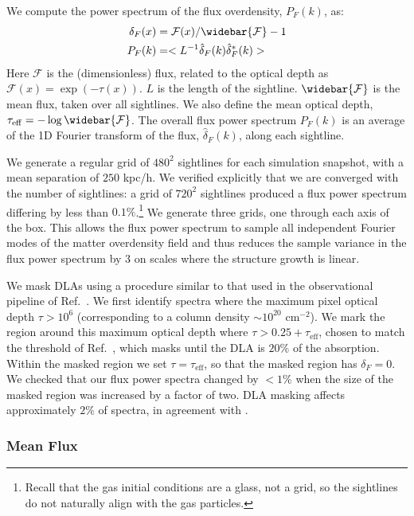 \documentclass[a4paper,11pt]{article}
\begin{document}
We compute the power spectrum of the flux overdensity, $P_F(k)$, as:
\begin{align}
 \delta_F(x) &= \mathcal{F}(x) / \widebar{\mathcal{F}} - 1 \\
 P_F(k) &= < L^{-1} \hat{\delta}_F(k) \hat{\delta}_F^*(k) >
\end{align}
Here $\mathcal{F}$ is the (dimensionless) flux, related to the optical depth as $\mathcal{F}(x) = \exp{(-\tau(x))}$. $L$ is the length of the sightline. $\widebar{\mathcal{F}}$ is the mean flux, taken over all sightlines. We also define the mean optical depth, $\tau_\mathrm{eff} = -\log \widebar{\mathcal{F}}$. The overall flux power spectrum $P_F(k) $ is an average of the 1D Fourier transform of the flux, $\hat{\delta}_F(k)$, along each sightline.

We generate a regular grid of $480^2$ sightlines for each simulation snapshot, with a mean separation of $250$ kpc/h. We verified explicitly that we are converged with the number of sightlines: a grid of $720^2$ sightlines produced a flux power spectrum differing by less than $0.1\%$.\footnote{Recall that the gas initial conditions are a glass, not a grid, so the sightlines do not naturally align with the gas particles.} We generate three grids, one through each axis of the box. This allows the flux power spectrum to sample all independent Fourier modes of the matter overdensity field and thus reduces the sample variance in the flux power spectrum by $3$ on scales where the structure growth is linear.

We mask DLAs using a procedure similar to that used in the observational pipeline of Ref.~\cite{Chabanier:2020}. We first identify spectra where the maximum pixel optical depth $\tau > 10^6$ (corresponding to a column density $\sim 10^{20}$ cm$^{-2}$). We mark the region around this maximum optical depth where $\tau > 0.25 + \tau_\mathrm{eff}$, chosen to match the threshold of Ref.~\cite{Chabanier:2020}, which masks until the DLA is $20\%$ of the absorption. Within the masked region we set $\tau = \tau_\mathrm{eff}$, so that the masked region has $\delta_F = 0$. We checked that our flux power spectra changed by $< 1\%$ when the size of the masked region was increased by a factor of two. DLA masking affects approximately $2\%$ of spectra, in agreement with \cite{Rogers:2019}.

\subsubsection{Mean Flux}
\end{document}

